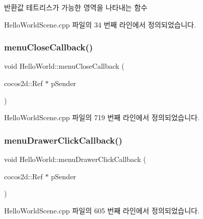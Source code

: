 \begin{DoxyReturn}{반환값}
테트리스가 가능한 영역을 나타내는 함수 
\end{DoxyReturn}


Hello\+World\+Scene.\+cpp 파일의 34 번째 라인에서 정의되었습니다.

\mbox{\label{class_hello_world_ac4ab2f5e922e659d4f137591c0f6a9b0}} 
\subsubsection{\texorpdfstring{menu\+Close\+Callback()}{menuCloseCallback()}}
{\footnotesize\ttfamily void Hello\+World\+::menu\+Close\+Callback (\begin{DoxyParamCaption}\item[{cocos2d\+::\+Ref $\ast$}]{p\+Sender }\end{DoxyParamCaption})}



Hello\+World\+Scene.\+cpp 파일의 719 번째 라인에서 정의되었습니다.

\mbox{\label{class_hello_world_a1609fd202ff4b899571aeb34b3cdaed4}} 
\subsubsection{\texorpdfstring{menu\+Drawer\+Click\+Callback()}{menuDrawerClickCallback()}}
{\footnotesize\ttfamily void Hello\+World\+::menu\+Drawer\+Click\+Callback (\begin{DoxyParamCaption}\item[{cocos2d\+::\+Ref $\ast$}]{p\+Sender }\end{DoxyParamCaption})}



Hello\+World\+Scene.\+cpp 파일의 605 번째 라인에서 정의되었습니다.

\mbox{\label{class_hello_world_aa0aab5c2537449752853c2924db53261}} 
